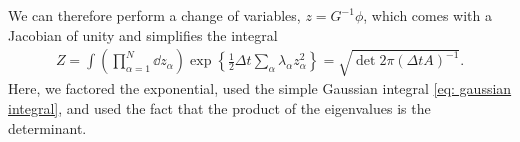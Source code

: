We can therefore perform a change of variables, $z = G^{-1}\phi$, which comes with a Jacobian of unity and simplifies the integral
%
\begin{align}
    Z = \int \left( \prod_{\alpha=1}^N \dd z_\alpha \right)
    \exp \left\{ \frac{1}{2}\Delta t \sum_{\alpha} \lambda_\alpha z_\alpha^2 \right\}
    =
    \sqrt{ \det 2 \pi (\Delta t A)^{-1} }.
\end{align}
%
Here, we factored the exponential, used the simple Gaussian integral \autoref{eq: gaussian integral}, and used the fact that the product of the eigenvalues is the determinant.
